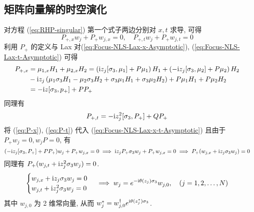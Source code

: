\subsection{矩阵向量解的时空演化}
对方程 (\ref{eq:RHP-singular}) 第一个式子两边分别对 $ x, t $ 求导, 可得
\begin{equation}
  P_{+, x} w_{j} + P_{+} w_{j, x} = 0, \quad P_{+, t} w_{j} + P_{+} w_{j, t} = 0 \label{eq:Focus-NLS-Lax-x-t-Asymptotic}
\end{equation}
利用 $ P_{+} $ 的定义与 Lax 对(\ref{eq:Focus-NLS-Lax-x-Asymptotic}), (\ref{eq:Focus-NLS-Lax-t-Asymptotic}) 可得
\begin{equation}
  \begin{aligned}
  P_{+,x} &= \mu_{1,x} H_{1} + \mu_{2,x} H_{2} = \left( \mathrm{i} z_{j} [\sigma_{3},\mu_{1}] + P\mu_{1} \right) H_{1} + \left( - \mathrm{i} z_{j} [\sigma_{3}, \mu_{2}] + P \mu_{2} \right) H_{2} \\
    & - \mathrm{i} z_{j} \left( \mu_{1} \sigma_{3} H_{1} - \mu_{2} \sigma_{3} H_{2} + \sigma_{3} \mu_{1} H_{1} + \sigma_{3} \mu_{2} H_{2} \right) + P \mu_{1} H_{1} + P \mu_{2} H_{2} \\ 
    &= - \mathrm{i} z [\sigma_{3}, p_{+}] + P P_{+}
  \end{aligned} \label{eq:P-x}
\end{equation}
同理有 
\begin{equation}
 P_{+,t} = - \mathrm{i} z_{j}^{2} [\sigma_{3}, P_{+}] + Q P_{+} \label{eq:P-t}
\end{equation} 将 (\ref{eq:P-x}), (\ref{eq:P-t}) 代入 (\ref{eq:Focus-NLS-Lax-x-t-Asymptotic}) 且由于 $ P_{+}w_{j} = 0, w_{j}P = 0 $, 有
\begin{equation}
  ( - \mathrm{i} z_{j} [\sigma_{3}, P_{+}] + P P_{+})w_{j} + P_{+}w_{j,x} = 0 \implies \mathrm{i} z_{j} P_{+} \sigma_{3} w_{j} + P_{+} w_{j,x} = 0 \implies P_{+}(w_{j,x} + \mathrm{i} z_{j} \sigma_{3}w_{j}) = 0
\end{equation}
同理有 $ P_{+}(w_{j,t} + \mathrm{i} z_{j}^{2} \sigma_{3} w_{j}) = 0 $. 
\begin{equation}
  \begin{cases}
    w_{j,x} + \mathrm{i} z_{j} \sigma_{3} w_{j} = 0 \\
    w_{j,t} + \mathrm{i} z_{j}^{2} \sigma_{3} w_{j} = 0
  \end{cases} \implies w_{j} = e^{- \mathrm{i} \theta(z_{j}) \sigma_{3}} w_{j,0}, \quad (j = 1,2, \dots, N)
\end{equation}
其中 $ w_{j,0} $ 为 2 维常向量, 从而 $ w_{j}^{*} = w_{j,0}^{\dagger} e^{\mathrm{i} \theta(z_{j}^{*}) \sigma_{3}} $. 

